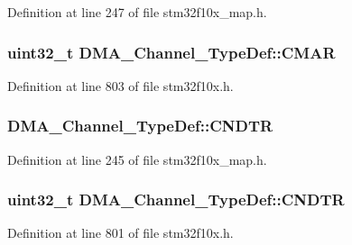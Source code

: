Definition at line 247 of file stm32f10x\+\_\+map.\+h.

\subsubsection[{\texorpdfstring{C\+M\+AR}{CMAR}}]{ {\bf uint32\+\_\+t} D\+M\+A\+\_\+\+Channel\+\_\+\+Type\+Def\+::\+C\+M\+AR}\hypertarget{struct_d_m_a___channel___type_def_a7a9886b5f9e0edaf5ced3d1870b33ad7}{}\label{struct_d_m_a___channel___type_def_a7a9886b5f9e0edaf5ced3d1870b33ad7}


Definition at line 803 of file stm32f10x.\+h.

\subsubsection[{\texorpdfstring{C\+N\+D\+TR}{CNDTR}}]{ D\+M\+A\+\_\+\+Channel\+\_\+\+Type\+Def\+::\+C\+N\+D\+TR}\hypertarget{struct_d_m_a___channel___type_def_a0c337fc15ad3374cd70e814afa0b2926}{}\label{struct_d_m_a___channel___type_def_a0c337fc15ad3374cd70e814afa0b2926}


Definition at line 245 of file stm32f10x\+\_\+map.\+h.

\subsubsection[{\texorpdfstring{C\+N\+D\+TR}{CNDTR}}]{ {\bf uint32\+\_\+t} D\+M\+A\+\_\+\+Channel\+\_\+\+Type\+Def\+::\+C\+N\+D\+TR}\hypertarget{struct_d_m_a___channel___type_def_af1c675e412fb96e38b6b4630b88c5676}{}\label{struct_d_m_a___channel___type_def_af1c675e412fb96e38b6b4630b88c5676}


Definition at line 801 of file stm32f10x.\+h.

